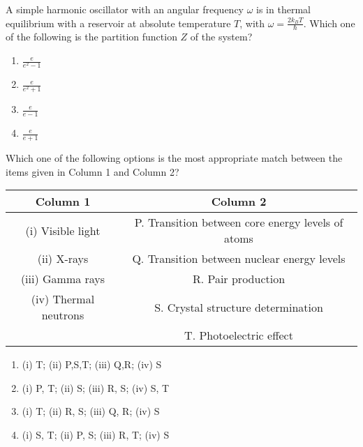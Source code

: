 \item A simple harmonic oscillator with an angular frequency $\omega$ is in thermal equilibrium with a reservoir at absolute temperature $T$, with $\omega = \frac{2 k_{B} T}{\hbar}$. Which one of the following is the partition function $Z$ of the system?
\begin{enumerate}
\item $\frac{e}{e^{2} - 1}$
\item $\frac{e}{e^{2}  + 1}$
\item $\frac{e}{e - 1}$
\item $\frac{e}{e + 1}$
\end{enumerate}

\item Which one of the following options is the most appropriate match between the items given in Column 1 and Column 2?

\begin{center}
\begin{tabular}{|c|c|}
\hline
\textbf{Column 1} & \textbf{Column 2} \\
\hline
(i) Visible light & P. Transition between core energy levels of atoms \\
\hline
(ii) X-rays & Q. Transition between nuclear energy levels \\
\hline
(iii) Gamma rays & R. Pair production \\
\hline
(iv) Thermal neutrons & S. Crystal structure determination \\
\hline
 & T. Photoelectric effect \\
\hline
\end{tabular}
\end{center}

\begin{enumerate}
    \item (i) T; (ii) P,S,T; (iii) Q,R; (iv) S
    \item (i) P, T; (ii) S; (iii) R, S; (iv) S, T
    \item (i) T; (ii) R, S; (iii) Q, R; (iv) S
    \item (i) S, T; (ii) P, S; (iii) R, T; (iv) S
\end{enumerate}




